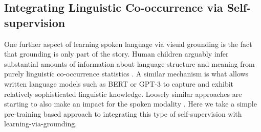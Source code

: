  

\subsection{Integrating Linguistic Co-occurrence via Self-supervision}
One further aspect of learning spoken language via visual grounding is
the fact that grounding is only part of the story. Human children
arguably infer substantial amounts of information about language
structure and meaning from purely linguistic co-occurrence
statistics \citep[e.g.,][]{saffran1996statistical}. A similar mechanism is what 
allows 
written language models
such as BERT \citep{devlin-etal-2019-bert} or GPT-3 \citep{brown2020language} 
to capture and exhibit relatively sophisticated
linguistic knowledge. Loosely similar approaches are starting to also
make an impact for the spoken modality
\citep[e.g.][]{wav2vec2,hsu2021hubert}. Here we take a simple
pre-training based approach to integrating this type of
self-supervision with learning-via-grounding.



